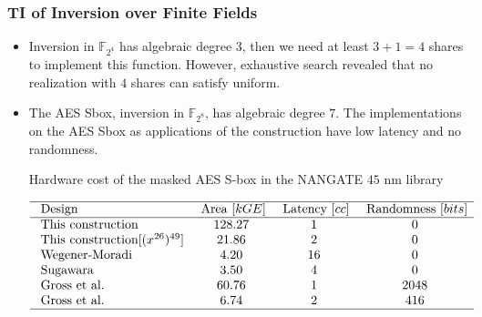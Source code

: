 \documentclass[
    aspectratio=169,                   %
]{beamer}
\newcommand{\F}{\mathbb{F}}
\begin{document}
    \begin{frame}
        \frametitle{TI of Inversion over Finite Fields}
        \begin{itemize}
            \item Inversion in $ \F_{2^4} $ has algebraic degree $ 3 $, then we need at least $ 3+1=4 $ shares to implement this function. 
            However, exhaustive search revealed that no realization with $ 4 $ shares can satisfy uniform. 
            \item The AES Sbox, inversion in $ \F_{2^8} $,  has algebraic degree $ 7 $. 
            The implementations on the AES Sbox as applications of the construction have low latency and no randomness. 
            \begin{table}
                \caption{Hardware cost of the masked AES S-box in the NANGATE $ 45 $ nm library}    
                $\begin{array}{lccc}
                \hline \text { Design } & \text { Area }[kGE] & \text { Latency }[cc] & \text { Randomness }[bits] \\
                \hline \text { This construction } & 128.27 & 1 & 0 \\
                \text { This construction} [(x^{26})^{49}] & 21.86 & 2 & 0 \\
                \text { Wegener-Moradi } & 4.20 & 16 & 0 \\
                \text { Sugawara } & 3.50 & 4 & 0 \\
                \text { Gross et al. } & 60.76 & 1 & 2048 \\
                \text { Gross et al. } & 6.74 & 2 & 416 \\
                \hline
            \end{array}$
        \end{table}

        \end{itemize}
    
    \end{frame}
    
\end{document}

